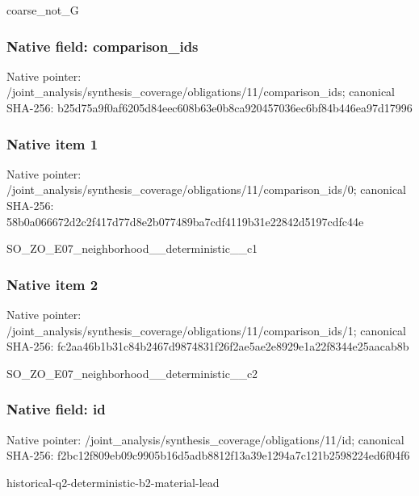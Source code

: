\documentclass[10pt,a4paper]{article}
\begin{document}
\begingroup\raggedright\sloppy coarse\_\allowbreak{}not\_\allowbreak{}G\par\endgroup

\subsubsection{Native field: comparison\_\allowbreak{}ids}
Native pointer: /joint\_\allowbreak{}analysis/synthesis\_\allowbreak{}coverage/obligations/11/comparison\_\allowbreak{}ids; canonical SHA-256: b25d75a9f0af6205d84eec608b63e0b8ca920457036ec6bf84b446ea97d17996

\subsubsection{Native item 1}
Native pointer: /joint\_\allowbreak{}analysis/synthesis\_\allowbreak{}coverage/obligations/11/comparison\_\allowbreak{}ids/0; canonical SHA-256: 58b0a066672d2c2f417d77d8e2b077489ba7cdf4119b31e22842d5197cdfc44e

\begingroup\raggedright\sloppy SO\_\allowbreak{}ZO\_\allowbreak{}E07\_\allowbreak{}neighborhood\_\allowbreak{}\_\allowbreak{}deterministic\_\allowbreak{}\_\allowbreak{}c1\par\endgroup

\subsubsection{Native item 2}
Native pointer: /joint\_\allowbreak{}analysis/synthesis\_\allowbreak{}coverage/obligations/11/comparison\_\allowbreak{}ids/1; canonical SHA-256: fc2aa46b1b31c84b2467d9874831f26f2ae5ae2e8929e1a22f8344e25aacab8b

\begingroup\raggedright\sloppy SO\_\allowbreak{}ZO\_\allowbreak{}E07\_\allowbreak{}neighborhood\_\allowbreak{}\_\allowbreak{}deterministic\_\allowbreak{}\_\allowbreak{}c2\par\endgroup

\subsubsection{Native field: id}
Native pointer: /joint\_\allowbreak{}analysis/synthesis\_\allowbreak{}coverage/obligations/11/id; canonical SHA-256: f2bc12f809eb09c9905b16d5adb8812f13a39e1294a7c121b2598224ed6f04f6

\begingroup\raggedright\sloppy historical-q2-deterministic-b2-material-lead\par\endgroup
\end{document}
